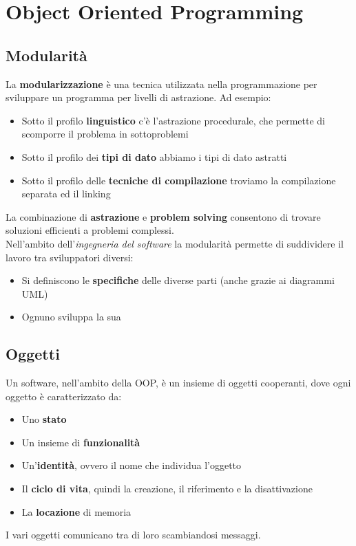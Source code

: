 \newpage
\section{Object Oriented Programming}
\subsection{Modularità}
La \textbf{modularizzazione} è una tecnica utilizzata nella programmazione per sviluppare un programma per livelli di astrazione. Ad esempio:
\begin{itemize}
	\item Sotto il profilo \textbf{linguistico} c'è l'astrazione procedurale, che permette di scomporre il problema in sottoproblemi
	\item Sotto il profilo dei \textbf{tipi di dato} abbiamo i tipi di dato astratti
	\item Sotto il profilo delle \textbf{tecniche di compilazione} troviamo la compilazione separata ed il linking
\end{itemize}
La combinazione di \textbf{astrazione} e \textbf{problem solving} consentono di trovare soluzioni efficienti a problemi complessi.\\
Nell'ambito dell'\textit{ingegneria del software} la modularità permette di suddividere il lavoro tra sviluppatori diversi:
\begin{itemize}
	\item Si definiscono le \textbf{specifiche} delle diverse parti (anche grazie ai diagrammi UML)
	\item Ognuno sviluppa la sua
\end{itemize}

\subsection{Oggetti}
Un software, nell'ambito della OOP, è un insieme di oggetti cooperanti, dove ogni oggetto è caratterizzato da:
\begin{itemize}
	\item Uno \textbf{stato}
	\item Un insieme di \textbf{funzionalità}
	\item Un'\textbf{identità}, ovvero il nome che individua l'oggetto
	\item Il \textbf{ciclo di vita}, quindi la creazione, il riferimento e la disattivazione
	\item La \textbf{locazione} di memoria
\end{itemize}
I vari oggetti comunicano tra di loro scambiandosi messaggi.
